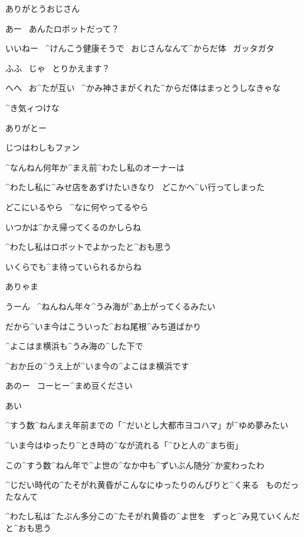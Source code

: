 \Alpha ありがとうおじさん

\Ojisan あー
\ あんたロボットだって？

\Ojisan いいねー
\ ^{けんこう}{健康}そうで
\ おじさんなんて^{からだ}{体}
\ ガッタガタ

\Alpha ふふ
\ じゃ
\ とりかえます？

\page
\Ojisan へへ
\ お^{たが}{互}い
\ ^{かみ}{神}さまがくれた^{からだ}{体}はまっとうしなきゃな

\Ojisan ^{き}{気}ィつけな

\Alpha ありがとー

\Ojisan じつはわしもファン

\page
\Alpha ^{なんねん}{何年}か^{まえ}{前}^{わたし}{私}のオーナーは

\Alpha ^{わたし}{私}に^{みせ}{店}をあずけたいきなり
\ どこかへ^{い}{行}ってしまった

\Alpha どこにいるやら
\ ^{なに}{何}やってるやら

\Alpha いつかは^{かえ}{帰}ってくるのかしらね

\Alpha ^{わたし}{私}はロボットでよかったと^{おも}{思}う

\Alpha いくらでも^{ま}{待}っていられるからね

\page[18]
\Alpha ありゃま

\Alpha うーん
\ ^{ねんねん}{年々}^{うみ}{海}が^{あ}{上}がってくるみたい

\page
\Alpha だから^{いま}{今}はこういった^{おね}{尾根}^{みち}{道}ばかり

\page
\Alpha ^{よこはま}{横浜}も^{うみ}{海}の^{した}{下}で

\Alpha ^{おか}{丘}の^{うえ}{上}が^{いま}{今}の^{よこはま}{横浜}です

\page[22]
\Alpha あのー
\ コーヒー^{まめ}{豆}ください

\Person あい

\Alpha ^{すう}{数}^{ねんまえ}{年前}までの「^{だいとし}{大都市}ヨコハマ」が^{ゆめ}{夢}みたい

\Alpha ^{いま}{今}はゆったり^{とき}{時}の^{なが}{流}れる「^{ひと}{人}の^{まち}{街}」

\page
\Alpha この^{すう}{数}^{ねん}{年}で^{よ}{世}の^{なか}{中}も^{ずいぶん}{随分}^{か}{変}わったわ

\Alpha ^{じだい}{時代}の^{たそがれ}{黄昏}がこんなにゆったりのんびりと^{く}{来}る
\ ものだったなんて

\Alpha ^{わたし}{私}は^{たぶん}{多分}この^{たそがれ}{黄昏}の^{よ}{世}を
\ ずっと^{み}{見}ていくんだと^{おも}{思}う

